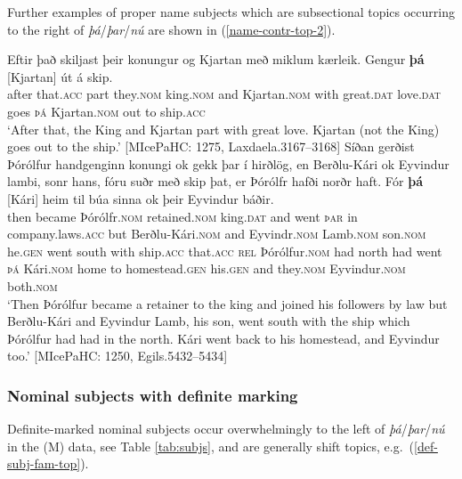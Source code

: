 \documentclass[output=paper,colorlinks,citecolor=brown]{langscibook}
\begin{document}
\noindent Further examples of proper name subjects which are subsectional topics occurring to the right of \textit{þá}/\textit{þar}/\textit{nú} are shown in (\ref{name-contr-top-2}).

\ea \label{name-contr-top-2}
\ea
    \gll Eftir það skiljast þeir konungur og Kjartan með miklum kærleik. Gengur \textbf{þá} [Kjartan] út á skip.\\
     after that.\textsc{acc} part they.\textsc{nom} king.\textsc{nom} and Kjartan.\textsc{nom} with great.\textsc{dat} love.\textsc{dat} goes \textsc{þá} Kjartan.\textsc{nom} out to ship.\textsc{acc}\\
    \glt `After that, the King and Kjartan part with great love. Kjartan (not the King) goes out to the ship.' \hfill [MIcePaHC: 1275, Laxdaela.3167--3168]
\ex 
    \gll Síðan gerðist Þórólfur handgenginn konungi ok gekk þar í hirðlög, en Berðlu-Kári ok Eyvindur lambi, sonr hans, fóru suðr með skip þat, er Þórólfr hafði norðr haft. Fór \textbf{þá} [Kári] heim til búa sinna ok þeir Eyvindur báðir.\\
    then became Þórólfr.\textsc{nom} retained.\textsc{nom} king.\textsc{dat} and went \textsc{þar} in company.laws.\textsc{acc} but Berðlu-Kári.\textsc{nom} and Eyvindr.\textsc{nom} Lamb.\textsc{nom} son.\textsc{nom} he.\textsc{gen} went south with ship.\textsc{acc} that.\textsc{acc} \textsc{rel} Þórólfur.\textsc{nom} had north had  went \textsc{þá} Kári.\textsc{nom} home to homestead.\textsc{gen} his.\textsc{gen} and they.\textsc{nom} Eyvindur.\textsc{nom} both.\textsc{nom}\\
    \glt `Then Þórólfur became a retainer to the king and joined  his followers by law but Berðlu-Kári and Eyvindur Lamb, his son, went south with the ship which Þórólfur had had in the north. Kári went back to his homestead, and Eyvindur too.' \hfill [MIcePaHC: 1250, Egils.5432--5434]
\z 
\z 

\subsubsection{Nominal subjects with definite marking}

Definite-marked nominal subjects occur overwhelmingly to the left of \textit{þá}/\textit{þar}/\textit{nú} in the (M) data, see Table \ref{tab:subjs}, and are generally shift topics, e.g.~(\ref{def-subj-fam-top}).
\end{document}
